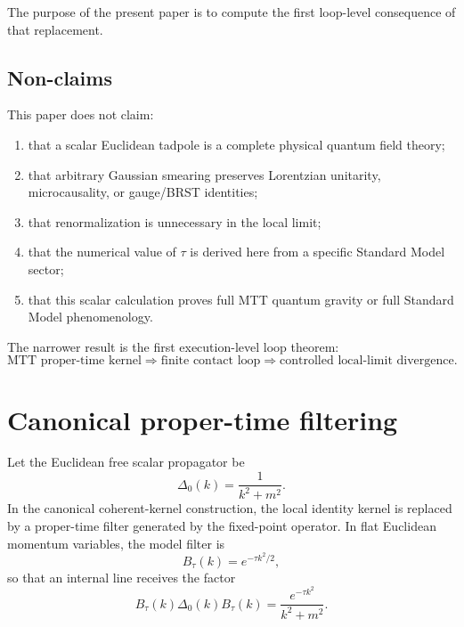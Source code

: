 \documentclass[11pt]{article}
\begin{document}
The purpose of the present paper is to compute the first loop-level consequence of that replacement.

\begin{center}
\end{center}

\subsection{Non-claims}

This paper does not claim:
\begin{enumerate}
\item that a scalar Euclidean tadpole is a complete physical quantum field theory;
\item that arbitrary Gaussian smearing preserves Lorentzian unitarity, microcausality, or gauge/BRST identities;
\item that renormalization is unnecessary in the local limit;
\item that the numerical value of \(\tau\) is derived here from a specific Standard Model sector;
\item that this scalar calculation proves full MTT quantum gravity or full Standard Model phenomenology.
\end{enumerate}

The narrower result is the first execution-level loop theorem:
\[
\text{MTT proper-time kernel}\Rightarrow\text{finite contact loop}\Rightarrow\text{controlled local-limit divergence}.
\]

\section{Canonical proper-time filtering}

Let the Euclidean free scalar propagator be
\[
\Delta_0(k)=\frac{1}{k^2+m^2}.
\]
In the canonical coherent-kernel construction, the local identity kernel is replaced by a proper-time filter generated by the fixed-point operator. In flat Euclidean momentum variables, the model filter is
\[
B_\tau(k)=e^{-\tau k^2/2},
\]
so that an internal line receives the factor
\[
B_\tau(k)\Delta_0(k)B_\tau(k)
=
\frac{e^{-\tau k^2}}{k^2+m^2}.
\]
\end{document}
